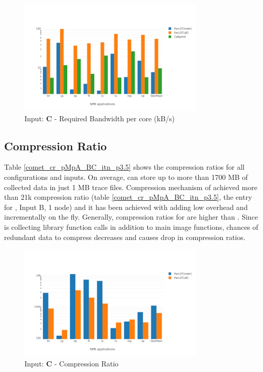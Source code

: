 \begin{figure}[!t]
\centering
\includegraphics[width=3.5in]{figs.comet.newMed/comet_chartAvg_bw_C_p3_5.png}
\caption{ Input: \textbf{C}  - Required Bandwidth per core (kB/s)
}
\label{comet_chartAvg_bw_C_p3_5}
\end{figure}


  
\subsection{Compression Ratio}
\label{subsec:cr}

Table \ref{comet_cr_pMpA_BC_itn_p3.5} shows the compression ratios for all configurations and inputs. On average, \parlot can store up to more than 1700 MB of collected data in just 1 MB trace files. Compression mechanism of \parlot achieved more than 21k compression ratio (table \ref{comet_cr_pMpA_BC_itn_p3.5}, the entry for \parlotm, Input B, 1 node) and it has been achieved with adding low overhead and incrementally on the fly.
Generally, compression ratios for \parlotm are higher than \parlota. Since \parlota is collecting library function calls in addition to main image functions, chances of redundant data to compress decreases and causes drop in compression ratios.
  



\begin{figure}[!t]
\centering
\includegraphics[width=3.5in]{figs.comet.newMed/comet_chartAvg_cr_C_p3_5.png}
\caption{ Input: \textbf{C}  - Compression Ratio
}
\label{comet_chartAvg_cr_C_p3_5}
\end{figure}



